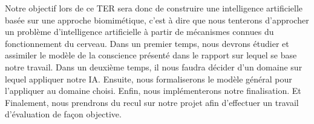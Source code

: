 Notre objectif lors de ce TER sera donc de construire une intelligence artificielle basée sur une approche biomimétique, c'est à dire que nous tenterons d'approcher un problème d'intelligence artificielle à partir de mécanismes connues du fonctionnement du cerveau. Dans un premier temps, nous devrons étudier et assimiler le modèle de la conscience présenté dans le rapport sur lequel se base notre travail. Dans un deuxième temps, il nous faudra décider d'un domaine sur lequel appliquer notre IA. Ensuite, nous formaliserons le modèle général pour l'appliquer au domaine choisi. Enfin, nous implémenterons notre finalisation. Et Finalement, nous prendrons du recul sur notre projet afin d'effectuer un travail d'évaluation de façon objective.
